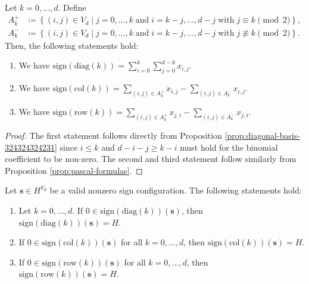 \begin{proposition}\label{skdmldskfmksdej}
    Let \( k = 0, \dots, d \). Define 
    \begin{align*}
        A_k^+ &\coloneqq \left\{ (i,j) \in V_d \mid j = 0, \dots, k \; \text{and} \; i = k-j, \dots, d-j \; \text{with} \; j \equiv k \pmod 2 \right\}, \\
        A_k^- &\coloneqq \left\{ (i,j) \in V_d \mid j = 0, \dots, k \; \text{and} \; i = k-j, \dots, d-j \; \text{with} \; j \not \equiv k \pmod 2 \right\}.
    \end{align*}
    Then, the following statements hold:
    \begin{enumerate}
        \item We have \( \mathrm{sign}(\mathrm{diag}(k)) = \sum_{i=0}^k \sum_{j=0}^{d-k} x_{i,j} \).

        \item We have \( \mathrm{sign}(\mathrm{col}(k)) = \sum_{(i,j) \in A_k^+} x_{i,j} - \sum_{(i,j) \in A_k^-} x_{i,j} \).

        \item We have \( \mathrm{sign}(\mathrm{row}(k)) = \sum_{(i,j) \in A_k^+} x_{j,i} - \sum_{(i,j) \in A_k^-} x_{j,i} \).
    \end{enumerate}
\end{proposition}

\begin{proof}
    The first statement follows directly from Proposition \ref{prop:diagonal-basis-324324324231} since \( i \leq k \) and \( d - i - j \geq k - i \) must hold for the binomial coefficient to be non-zero. The second and third statement follow similarly from Proposition \ref{prop:pascal-formulas}.
\end{proof}

\begin{proposition}\label{prop:sign-sikjsfnf322}
    Let \( \mathbf{s} \in H^{V_d} \) be a valid nonzero sign configuration. The following statements hold:
    \begin{enumerate}
        \item Let \( k = 0, \dots, d \). If \( 0 \in \mathrm{sign}(\mathrm{diag}(k))(\mathbf{s})  \), then \( \mathrm{sign}(\mathrm{diag}(k))(\mathbf{s}) = H \).
        \item If \( 0 \in \mathrm{sign}(\mathrm{col}(k))(\mathbf{s}) \) for all \( k = 0, \dots, d \), then \( \mathrm{sign}(\mathrm{col}(k))(\mathbf{s}) = H \).
        \item If \( 0 \in \mathrm{sign}(\mathrm{row}(k))(\mathbf{s}) \) for all \( k = 0, \dots, d \), then \( \mathrm{sign}(\mathrm{row}(k))(\mathbf{s}) = H \).
    \end{enumerate}
\end{proposition}

